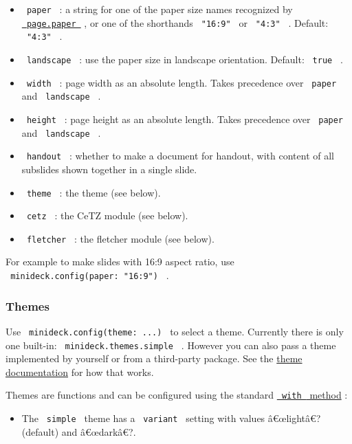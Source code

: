 \begin{itemize}
\tightlist
\item
  \texttt{\ paper\ } : a string for one of the paper size names
  recognized by
  \href{https://typst.app/docs/reference/layout/page/\#parameters-paper}{\texttt{\ page.paper\ }}
  , or one of the shorthands \texttt{\ "16:9"\ } or \texttt{\ "4:3"\ } .
  Default: \texttt{\ "4:3"\ } .
\item
  \texttt{\ landscape\ } : use the paper size in landscape orientation.
  Default: \texttt{\ true\ } .
\item
  \texttt{\ width\ } : page width as an absolute length. Takes
  precedence over \texttt{\ paper\ } and \texttt{\ landscape\ } .
\item
  \texttt{\ height\ } : page height as an absolute length. Takes
  precedence over \texttt{\ paper\ } and \texttt{\ landscape\ } .
\item
  \texttt{\ handout\ } : whether to make a document for handout, with
  content of all subslides shown together in a single slide.
\item
  \texttt{\ theme\ } : the theme (see below).
\item
  \texttt{\ cetz\ } : the CeTZ module (see below).
\item
  \texttt{\ fletcher\ } : the fletcher module (see below).
\end{itemize}

For example to make slides with 16:9 aspect ratio, use
\texttt{\ minideck.config(paper:\ "16:9")\ } .

\subsubsection{Themes}\label{themes}

Use \texttt{\ minideck.config(theme:\ ...)\ } to select a theme.
Currently there is only one built-in:
\texttt{\ minideck.themes.simple\ } . However you can also pass a theme
implemented by yourself or from a third-party package. See the
\href{https://github.com/typst/packages/raw/main/packages/preview/minideck/0.2.1/themes/README.md}{theme
documentation} for how that works.

Themes are functions and can be configured using the standard
\href{https://typst.app/docs/reference/foundations/function/\#definitions-with}{\texttt{\ with\ }
method} :

\begin{itemize}
\tightlist
\item
  The \texttt{\ simple\ } theme has a \texttt{\ variant\ } setting with
  values â€œlightâ€? (default) and â€œdarkâ€?.
\end{itemize}

